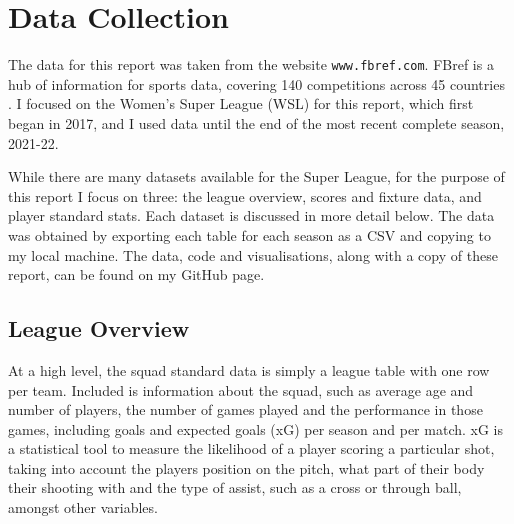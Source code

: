 \documentclass[12pt, a4paper, twocolumn]{article}
\begin{document}

\twocolumn[
  \begin{@twocolumnfalse}
    \maketitle
    \begin{abstract}
      \abstractText
      \newline
      \newline
    \end{abstract}
  \end{@twocolumnfalse}
]


\section{Data Collection}

The data for this report was taken from the website \verb|www.fbref.com|. FBref is a hub of information for sports data, covering 140 competitions across 45 countries \cite{fbref}. I focused on the Women's Super League (WSL) for this report, which first began in 2017, and I used data until the end of the most recent complete season, 2021-22. 

While there are many datasets available for the Super League, for the purpose of this report I focus on  three: the league overview, scores and fixture data, and player standard stats. Each dataset is discussed in more detail below. The data was obtained by exporting each table for each season as a CSV and copying to my local machine. The data, code and visualisations, along with a copy of these report, can be found on my GitHub page\cite{git}.

\subsection{League Overview}

At a high level, the squad standard data\cite{overview} is simply a league table with one row per team. Included is information about the squad, such as average age and number of players, the number of games played and the performance in those games, including goals and expected goals (xG) per season and per match. xG is a statistical tool to measure the likelihood of a player scoring a particular shot, taking into account the players position on the pitch, what part of their body their shooting with and the type of assist, such as a cross or through ball, amongst other variables\cite{xg}.
\end{document}
